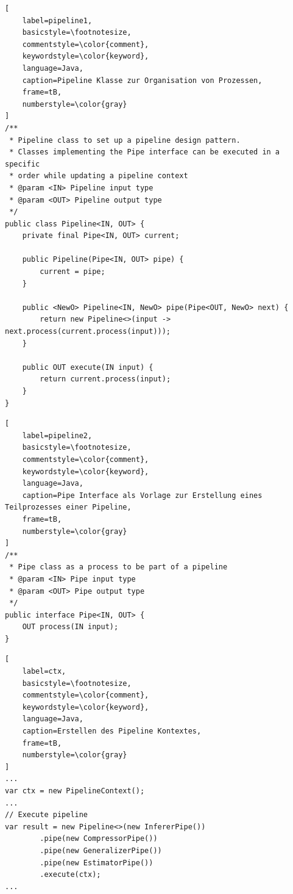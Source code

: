 \newpage

\begin{lstlisting}[
    label=pipeline1,
    basicstyle=\footnotesize,
    commentstyle=\color{comment},
    keywordstyle=\color{keyword},
    language=Java,
    caption=Pipeline Klasse zur Organisation von Prozessen,
    frame=tB,
    numberstyle=\color{gray}
]
/**
 * Pipeline class to set up a pipeline design pattern.
 * Classes implementing the Pipe interface can be executed in a specific
 * order while updating a pipeline context
 * @param <IN> Pipeline input type
 * @param <OUT> Pipeline output type
 */
public class Pipeline<IN, OUT> {
    private final Pipe<IN, OUT> current;

    public Pipeline(Pipe<IN, OUT> pipe) {
        current = pipe;
    }

    public <NewO> Pipeline<IN, NewO> pipe(Pipe<OUT, NewO> next) {
        return new Pipeline<>(input -> next.process(current.process(input)));
    }

    public OUT execute(IN input) {
        return current.process(input);
    }
}
\end{lstlisting}

\begin{lstlisting}[
    label=pipeline2,
    basicstyle=\footnotesize,
    commentstyle=\color{comment},
    keywordstyle=\color{keyword},
    language=Java,
    caption=Pipe Interface als Vorlage zur Erstellung eines Teilprozesses einer Pipeline,
    frame=tB,
    numberstyle=\color{gray}
]
/**
 * Pipe class as a process to be part of a pipeline
 * @param <IN> Pipe input type
 * @param <OUT> Pipe output type
 */
public interface Pipe<IN, OUT> {
    OUT process(IN input);
}
\end{lstlisting}

\newpage

\begin{lstlisting}[
    label=ctx,
    basicstyle=\footnotesize,
    commentstyle=\color{comment},
    keywordstyle=\color{keyword},
    language=Java,
    caption=Erstellen des Pipeline Kontextes,
    frame=tB,
    numberstyle=\color{gray}
]
...
var ctx = new PipelineContext();
...
// Execute pipeline
var result = new Pipeline<>(new InfererPipe())
        .pipe(new CompressorPipe())
        .pipe(new GeneralizerPipe())
        .pipe(new EstimatorPipe())
        .execute(ctx);
...
\end{lstlisting}

